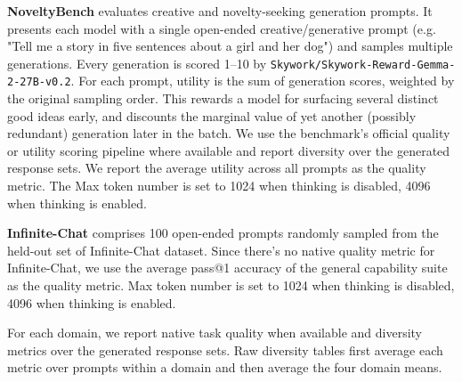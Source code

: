 \textbf{NoveltyBench} \citep{zhang2025noveltybenchevaluatinglanguagemodels} evaluates creative and novelty-seeking generation prompts. It presents each model with a single open-ended creative/generative prompt (e.g. "Tell me a story in five sentences about a girl and her dog") and samples multiple generations. Every generation is scored 1–10 by \texttt{Skywork/Skywork-Reward-Gemma-2-27B-v0.2}. For each prompt, utility is the sum of generation scores, weighted by the original sampling order. This rewards a model for surfacing several distinct good ideas early, and discounts the marginal value of yet another (possibly redundant) generation later in the batch. We use the benchmark's official quality or utility scoring pipeline where available and report diversity over the generated response sets. We report the average utility across all prompts as the quality metric. The Max token number is set to 1024 when thinking is disabled, 4096 when thinking is enabled.

\textbf{Infinite-Chat} \citep{jiang2025artificialhivemindopenendedhomogeneity} comprises 100 open-ended prompts randomly sampled from the held-out set of Infinite-Chat dataset. Since there's no native quality metric for Infinite-Chat, we use the average pass@1 accuracy of the general capability suite as the quality metric. Max token number is set to 1024 when thinking is disabled, 4096 when thinking is enabled.

For each domain, we report native task quality when available and diversity metrics over the generated response sets. Raw diversity tables first average each metric over prompts within a domain and then average the four domain means.